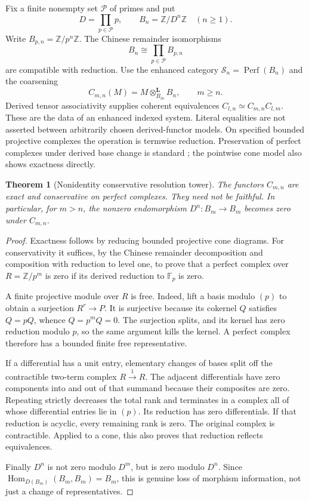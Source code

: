 \documentclass[11pt]{article}
\newtheorem{theorem}{Theorem}[section]
\theoremstyle{definition}
\theoremstyle{remark}
\begin{document}
Fix a finite nonempty set $\mathcal P$ of primes and put
\[
 D=\prod_{p\in\mathcal P}p,\qquad B_n=\mathbb Z/D^n\mathbb Z\quad(n\geq1).
\]
Write $B_{p,n}=\mathbb Z/p^n\mathbb Z$. The Chinese remainder isomorphisms
\[
 B_n\cong\prod_{p\in\mathcal P}B_{p,n}
\]
are compatible with reduction. Use the enhanced category $\mathcal S_n=\operatorname{Perf}(B_n)$ and the coarsening
\[
 C_{m,n}(M)=M\otimes^{\mathbf L}_{B_m}B_n,\qquad m\geq n.
\]
Derived tensor associativity supplies coherent equivalences $C_{l,n}\simeq C_{m,n}C_{l,m}$. These are the data of an enhanced indexed system. Literal equalities are not asserted between arbitrarily chosen derived-functor models. On specified bounded projective complexes the operation is termwise reduction. Preservation of perfect complexes under derived base change is standard \cite{StacksPerfect}; the pointwise cone model also shows exactness directly.

\begin{theorem}[Nonidentity conservative resolution tower]\label{thm:adic-tower}
The functors $C_{m,n}$ are exact and conservative on perfect complexes. They need not be faithful. In particular, for $m>n$, the nonzero endomorphism $D^n:B_m\to B_m$ becomes zero under $C_{m,n}$.
\end{theorem}
\begin{proof}
Exactness follows by reducing bounded projective cone diagrams. For conservativity it suffices, by the Chinese remainder decomposition and composition with reduction to level one, to prove that a perfect complex over $R=\mathbb Z/p^m$ is zero if its derived reduction to $\mathbb F_p$ is zero.

A finite projective module over $R$ is free. Indeed, lift a basis modulo $(p)$ to obtain a surjection $R^r\to P$. It is surjective because its cokernel $Q$ satisfies $Q=pQ$, whence $Q=p^mQ=0$. The surjection splits, and its kernel has zero reduction modulo $p$, so the same argument kills the kernel. A perfect complex therefore has a bounded finite free representative.

If a differential has a unit entry, elementary changes of bases split off the contractible two-term complex $R\xrightarrow{1}R$. The adjacent differentials have zero components into and out of that summand because their composites are zero. Repeating strictly decreases the total rank and terminates in a complex all of whose differential entries lie in $(p)$. Its reduction has zero differentials. If that reduction is acyclic, every remaining rank is zero. The original complex is contractible. Applied to a cone, this also proves that reduction reflects equivalences.

Finally $D^n$ is not zero modulo $D^m$, but is zero modulo $D^n$. Since $\operatorname{Hom}_{D(B_m)}(B_m,B_m)=B_m$, this is genuine loss of morphism information, not just a change of representatives.
\end{proof}
\end{document}
